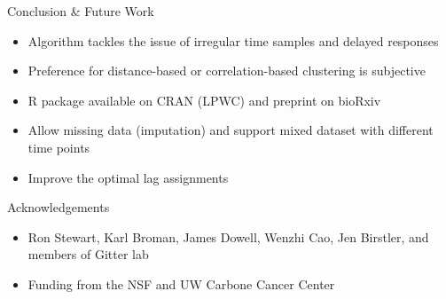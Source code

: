 \documentclass[10pt]{beamer}
\begin{document}
\begin{frame}{Conclusion \& Future Work}
\begin{itemize}
\item Algorithm tackles the issue of irregular time samples and delayed responses
\item Preference for distance-based or correlation-based clustering is subjective
\item R package available on CRAN (LPWC) and preprint on bioRxiv
\item Allow missing data (imputation) and support mixed dataset with different time points
\item Improve the optimal lag assignments
\end{itemize}
\end{frame}


\begin{frame}{Acknowledgements}

\begin{itemize}
\item Ron Stewart, Karl Broman, James Dowell, Wenzhi Cao, Jen Birstler, and members of Gitter lab
\item Funding from the NSF and UW Carbone Cancer Center
\end{itemize}

\end{frame}



\end{document}

